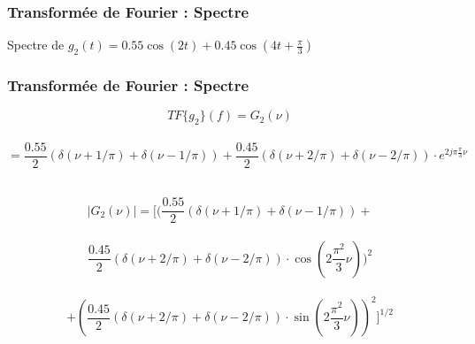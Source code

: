 \documentclass{beamer}
\begin{document}
\begin{frame}
\frametitle{Transformée  de Fourier : Spectre}
Spectre de $g_2(t) = 0.55\cos(2 t) + 0.45 \cos(4 t + \frac{\pi}{3})$ \\
\end{frame}

\begin{frame}
\frametitle{Transformée  de Fourier : Spectre}

\[ TF\{ g_2 \}(f) = G_2(\nu)\]\\
\[ =   \frac{0.55}{2}(\delta(\nu+1/\pi) + \delta(\nu-1/\pi)) + \frac{0.45}{2}(\delta(\nu+2/\pi) + \delta(\nu-2/\pi)) \cdot e^{2 j \pi \frac{\pi}{3} \nu }\]\\

\vspace{0.5 cm}

\[|G_2(\nu)| = \bigl[(\frac{0.55}{2}(\delta(\nu+1/\pi) + \delta(\nu-1/\pi))+ \] \\
\[ \frac{0.45}{2}(\delta(\nu+2/\pi) + \delta(\nu-2/\pi)) \cdot  \cos(2\frac{\pi^2}{3} \nu))^2 \]\\
\[+(\frac{0.45}{2}(\delta(\nu+2/\pi) + \delta(\nu-2/\pi)) \cdot  \sin(2\frac{\pi^2}{3} \nu))^2 \bigr] ^{1/2} \]

\end{frame}
\end{document}
